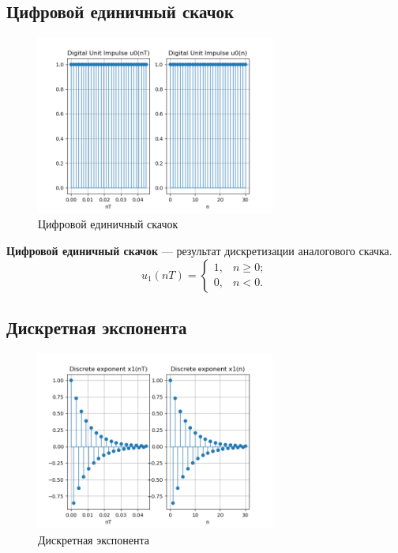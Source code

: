 \documentclass[a4paper, 14pt]{extarticle}
\begin{document}
\subsection{Цифровой единичный скачок}
\begin{figure}[h]
    \centering
    \includegraphics[width=0.7\textwidth]{img/signals/2.png}
    \caption{Цифровой единичный скачок}%
\end{figure}
\FloatBarrier{}
\textbf{Цифровой единичный скачок} --- результат дискретизации аналогового скачка.
\begin{equation}
    u_1 (nT) = \begin{cases}
        1, &n \ge 0;\\
        0, &n < 0.
    \end{cases}
\end{equation}

\clearpage
\subsection{Дискретная экспонента}
\begin{figure}[h]
    \centering
    \includegraphics[width=0.7\textwidth]{img/signals/3.png}
    \caption{Дискретная экспонента}%
    \label{img:}
\end{figure}
\end{document}

